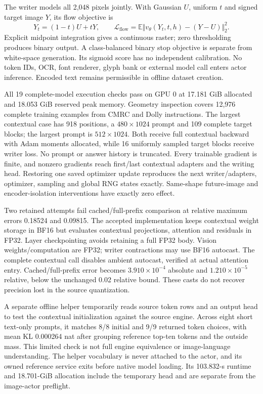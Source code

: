 \documentclass[10pt,a4paper]{article}
\begin{document}
The writer models all 2,048 pixels jointly. With Gaussian $U$, uniform $t$ and
signed target image $Y$, its flow objective is
\begin{equation}
 Y_t=(1-t)U+tY,\qquad
 \mathcal L_{\mathrm{flow}}=\mathbb E\Vert v_\theta(Y_t,t,h)-(Y-U)\Vert_2^2.
\end{equation}
Explicit midpoint integration gives a continuous raster; zero thresholding
produces binary output. A class-balanced binary stop objective is separate
from white-space generation. Its sigmoid score has no independent calibration.
No token IDs, OCR, font renderer, glyph bank or external model call enters
actor inference. Encoded text remains permissible in offline dataset creation.

All 19 complete-model execution checks pass on GPU 0 at 17.181 GiB allocated
and 18.053 GiB reserved peak memory. Geometry inspection covers 12,976 complete
training examples from CMRC and Dolly instructions\cite{cmrc,dolly}. The
largest contextual case has 918 positions, a $480\times1024$ prompt and
109 complete target blocks; the largest prompt is $512\times1024$.
Both receive full contextual backward with Adam moments allocated, while
16 uniformly sampled target blocks receive writer loss. No prompt or
answer history is truncated. Every trainable gradient is finite, and
nonzero gradients reach first/last contextual adapters and the writing head.
Restoring one saved optimizer update reproduces the next writer/adapters,
optimizer, sampling and global RNG states exactly. Same-shape future-image
and encoder-isolation interventions have exactly zero effect.

Two retained attempts fail cached/full-prefix comparison at relative maximum
errors 0.18524 and 0.09815. The accepted implementation keeps contextual weight
storage in BF16 but evaluates contextual projections, attention and residuals
in FP32. Layer checkpointing avoids retaining a full FP32 body. Vision
weights/computation are FP32; writer contractions may use BF16 autocast.
The complete contextual call disables ambient autocast, verified at actual
attention entry. Cached/full-prefix error becomes $3.910\times10^{-4}$
absolute and $1.210\times10^{-5}$ relative, below the unchanged 0.02 relative
bound. These casts do not recover precision lost in the source quantization.

A separate offline helper temporarily reads source token rows and an output
head to test the contextual initialization against the source engine. Across
eight short text-only prompts, it matches 8/8 initial and 9/9 returned token
choices, with mean KL 0.000264 nat after grouping reference top-ten tokens
and the outside mass. This limited check is not full engine equivalence or
image-language understanding. The helper vocabulary is never attached to
the actor, and its owned reference service exits before native model loading.
Its 103.832-s runtime and 18.701-GiB allocation include the temporary head
and are separate from the image-actor preflight.
\end{document}
